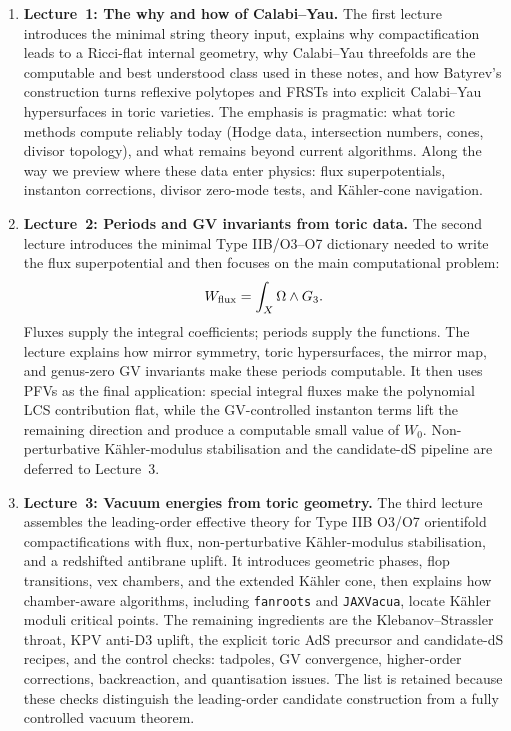 \begin{enumerate}[leftmargin=*]
    \item \textbf{Lecture~1: The why and how of Calabi--Yau.}
    The first lecture introduces the minimal string theory input,
    explains why compactification leads to a
    Ricci-flat internal geometry, why Calabi--Yau threefolds are the
    computable and best understood class used in these notes, and how
    Batyrev's construction turns reflexive polytopes and FRSTs into
    explicit Calabi--Yau hypersurfaces in toric varieties. The emphasis
    is pragmatic: what toric methods compute reliably today
    (Hodge data, intersection numbers, cones, divisor topology), and
    what remains beyond current algorithms.
    Along the way we preview where these data enter physics: flux
    superpotentials, instanton corrections, divisor zero-mode tests,
    and K\"ahler-cone navigation.

    \item \textbf{Lecture~2: Periods and GV invariants from toric data.}
    The second lecture introduces the minimal Type IIB/O3--O7
    dictionary needed to write the flux superpotential and then
    focuses on the main computational problem:
    \begin{equation}
        W_{\rm flux}=\int_X\Omega\wedge G_3 .
    \end{equation}
    Fluxes supply the integral coefficients; periods supply the
    functions. The lecture explains how mirror symmetry, toric
    hypersurfaces, the mirror map, and genus-zero GV invariants make
    these periods computable. It then uses PFVs as the final
    application: special integral fluxes make the polynomial LCS
    contribution flat, while the GV-controlled instanton terms lift
    the remaining direction and produce a computable small value of
    $W_0$. Non-perturbative K\"ahler-modulus stabilisation and the
    candidate-dS pipeline are deferred to Lecture~3.

    \item \textbf{Lecture~3: Vacuum energies from toric geometry.}
    The third lecture assembles the leading-order effective
    theory for Type IIB O3/O7 orientifold compactifications with flux,
    non-perturbative K\"ahler-modulus stabilisation, and a
    redshifted antibrane uplift. It introduces
    geometric phases, flop transitions, vex chambers, and the
    extended K\"ahler cone,
    then explains how chamber-aware algorithms, including
    \texttt{fanroots} and \texttt{JAXVacua}, locate
    K\"ahler moduli critical points. The remaining ingredients are the
    Klebanov--Strassler throat, KPV anti-D3 uplift, the explicit
    toric AdS precursor and candidate-dS recipes, and the control
    checks: tadpoles, GV convergence, higher-order corrections,
    backreaction, and quantisation issues. The list is retained
    because these checks distinguish the leading-order candidate
    construction from a fully controlled vacuum theorem.
\end{enumerate}

\setcounter{section}{0}
